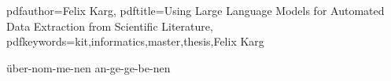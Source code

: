 \usepackage{tabularx}
\usepackage{changepage}
\usepackage{subfig}
\usepackage{float}
\usepackage{csquotes}
\usepackage[acronym,toc]{glossaries}
\makeglossaries



\newcommand{\vect}[1]{\boldsymbol{\bm{#1}}} %

\newcommand{\thesisauthor}{Felix Karg}

\newcommand{\thesisentopic}{Using Large Language Models for Automated Data Extraction from Scientific Literature}

\newcommand{\thesisinstitute}{Institute of Theoretical Informatics}
\newcommand{\thesisreviewerone}{T.T.-Prof. Dr. Pascal Friederich}
\newcommand{\thesisreviewertwo}{Prof. Dr. Second Reviewer}
\newcommand{\thesisadvisorone}{Tobias Schlöder}
\newcommand{\thesistimestart}{2023-03-01} %
\newcommand{\longdate}{2nd October 2023} %
\newcommand{\thesistimeend}{2023-10-02} %
\newcommand{\thesistimehandin}{2023-10-02} %
\newcommand{\thesispagehead}{\thesisentopic} %


\newcommand{\secref}[1]{Section~\ref{sec:#1}}
\renewcommand{\subref}[1]{Subsection~\ref{sub:#1}}
\newcommand{\chapref}[1]{Chapter~\ref{chap:#1}}
\renewcommand{\eqref}[1]{Equation~(\ref{eq:#1})}
\newcommand{\figref}[1]{Figure~\ref{fig:#1}}
\newcommand{\tabref}[1]{Table~\ref{tab:#1}}
\newcommand{\coderef}[1]{Code Example~\ref{code:#1}}
\newcommand{\outref}[1]{Output~\ref{out:#1}}


\hypersetup
{
    pdfauthor={\thesisauthor},
    pdftitle={\thesisentopic},
    pdfkeywords={kit,informatics,master,thesis,\thesisauthor}
}

\hyphenation
{
    über-nom-me-nen an-ge-ge-be-nen
}


